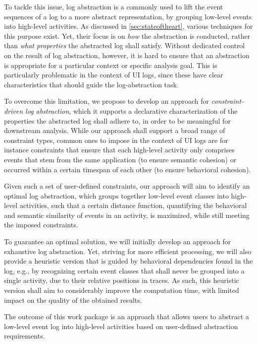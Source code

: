 To tackle this issue, log abstraction is a commonly used to lift the event sequences of a log to a more abstract representation, by grouping low-level events into high-level activities. 
As discussed in \autoref{sec:stateoftheart}, various techniques for this purpose exist. Yet, their focus is on \emph{how} the abstraction is conducted, rather than \emph{what properties} the abstracted log shall satisfy. Without dedicated control on the result of log abstraction, however, it is hard to ensure that an abstraction is appropriate for a particular context or specific analysis goal.
This is particularly problematic in the context of UI logs, since these have clear characteristics that should guide the log-abstraction task.

To overcome this limitation, we propose to develop an approach for \emph{constraint-driven log abstraction}, which it supports a declarative characterization of the properties the abstracted log shall adhere to, in order to be meaningful for downstream analysis. While our approach shall support a broad range of constraint types, common ones to impose in the context of UI logs are for instance constraints that ensure that each high-level activity only comprises events that stem from the same application (to ensure semantic cohesion) or occurred within a certain timespan of each other (to ensure behavioral cohesion). 

Given such a set of user-defined constraints, our approach will aim to identify an optimal log abstraction, which groups together low-level event classes into high-level activities, such that a certain distance function, quantifying the behavioral and semantic similarity of events in an activity, is maximized, while still meeting the imposed constraints.

To guarantee an optimal solution, we will initially develop an approach for exhaustive log abstraction. Yet, striving for more efficient processing, we will also provide a heuristic version that is guided by behavioral dependencies found in the log, e.g., by recognizing certain event classes that shall never be grouped into a single activity, due to their relative positions in traces.
As such, this heuristic version shall aim to considerably improve the computation time, with limited impact on the quality of the obtained results.

 The outcome of this work package is an approach that allows users to abstract a low-level event log into high-level activities based on user-defined abstraction requirements. 


